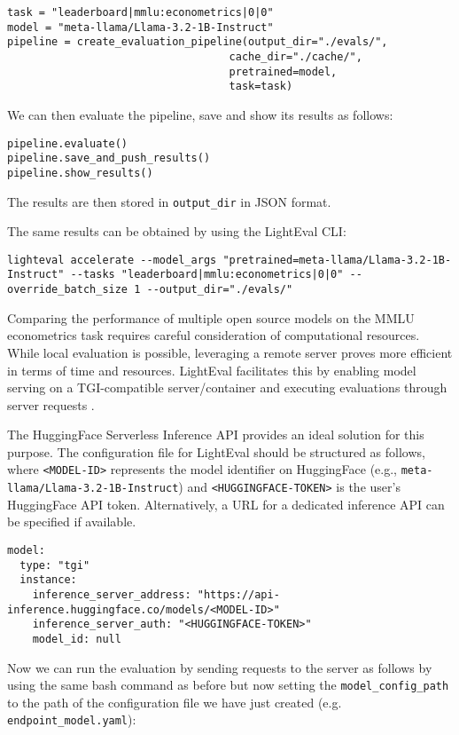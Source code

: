 \begin{verbatim}
task = "leaderboard|mmlu:econometrics|0|0"
model = "meta-llama/Llama-3.2-1B-Instruct"
pipeline = create_evaluation_pipeline(output_dir="./evals/", 
                                   cache_dir="./cache/", 
                                   pretrained=model, 
                                   task=task)
\end{verbatim}
We can then evaluate the pipeline, save and show its results as follows:

\begin{verbatim}
pipeline.evaluate()
pipeline.save_and_push_results()
pipeline.show_results()
\end{verbatim}

The results are then stored in \texttt{output\_dir} in JSON format.

The same results can be obtained by using the LightEval CLI:

\begin{verbatim}
lighteval accelerate --model_args "pretrained=meta-llama/Llama-3.2-1B-Instruct" --tasks "leaderboard|mmlu:econometrics|0|0" --override_batch_size 1 --output_dir="./evals/"
\end{verbatim}
Comparing the performance of multiple open source models on the MMLU econometrics task requires careful consideration of computational resources. While local evaluation is possible, leveraging a remote server proves more efficient in terms of time and resources. LightEval facilitates this by enabling model serving on a TGI-compatible server/container and executing evaluations through server requests .

The HuggingFace Serverless Inference API provides an ideal solution for this purpose. The configuration file for LightEval should be structured as follows, where \texttt{<MODEL-ID>} represents the model identifier on HuggingFace (e.g., \texttt{meta-llama/Llama-3.2-1B-Instruct}) and \texttt{<HUGGINGFACE-TOKEN>} is the user's HuggingFace API token. Alternatively, a URL for a dedicated inference API can be specified if available.

\begin{verbatim}
model:
  type: "tgi"
  instance:
    inference_server_address: "https://api-inference.huggingface.co/models/<MODEL-ID>"
    inference_server_auth: "<HUGGINGFACE-TOKEN>"
    model_id: null
\end{verbatim}
Now we can run the evaluation by sending requests to the server as follows by using the same bash command as before but now setting the \texttt{model\_config\_path} to the path of the configuration file we have just created (e.g. \texttt{endpoint\_model.yaml}):

